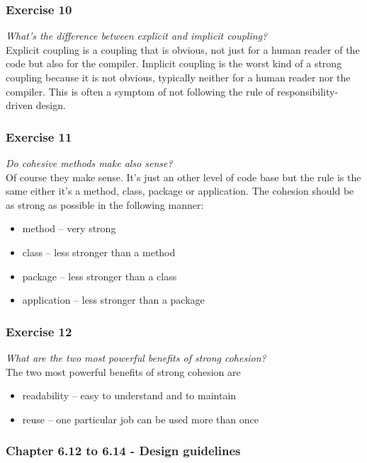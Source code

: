 \subsubsection*{Exercise 10}
\textit{What's the difference between explicit and implicit coupling?} \\
Explicit coupling is a coupling that is obvious, not just for a human reader
of the code but also for the compiler. Implicit coupling is the worst kind
of a strong coupling because it is not obvious, typically neither for a 
human reader nor the compiler. This is often a symptom of not following
the rule of responsibility-driven design.

\subsubsection*{Exercise 11}
\textit{Do cohesive methods make also sense?} \\
Of course they make sense. It's just an other level of code base but
the rule is the same either it's a method, class, package or application.
The cohesion should be as strong as possible in the following manner:
\begin{itemize}
	\item method -- very strong
	\item class -- less stronger than a method
	\item package -- less stronger than a class
	\item application -- less stronger than a package
\end{itemize} 

\subsubsection*{Exercise 12}
\textit{What are the two most powerful benefits of strong cohesion?} \\
The two most powerful benefits of strong cohesion are 
\begin{itemize}
	\item readability -- easy to understand and to maintain
	\item reuse -- one particular job can be used more than once 
\end{itemize}

\subsubsection{Chapter 6.12 to 6.14 - Design guidelines}


